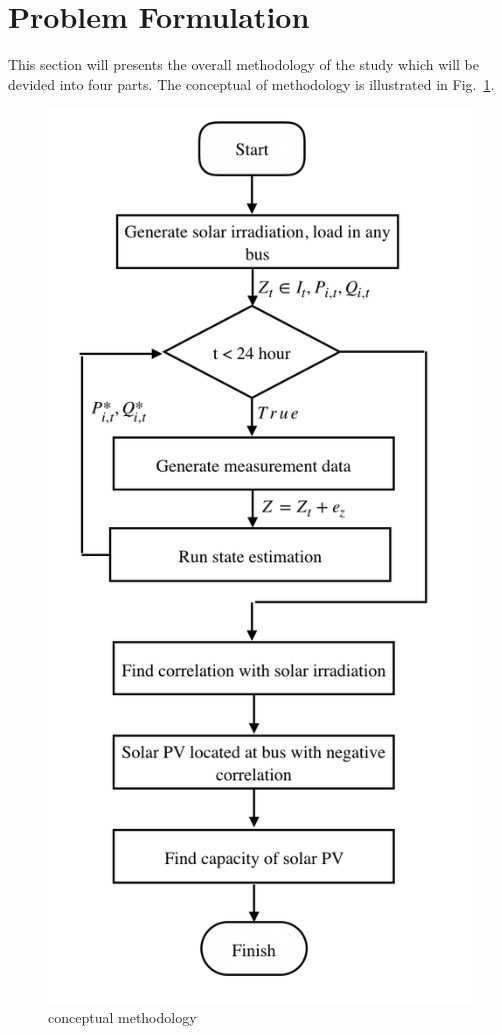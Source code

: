 \section{Problem Formulation}
This section will presents the overall methodology of the study which will be devided into four parts.
The conceptual of methodology is illustrated in Fig.~\ref{fig.method}.

\begin{figure}[h!]
  \center
  \includegraphics[scale=0.5]{images/conceptual_methodology.png}
  \caption{conceptual methodology}
  \label{fig.method}
\end{figure}


